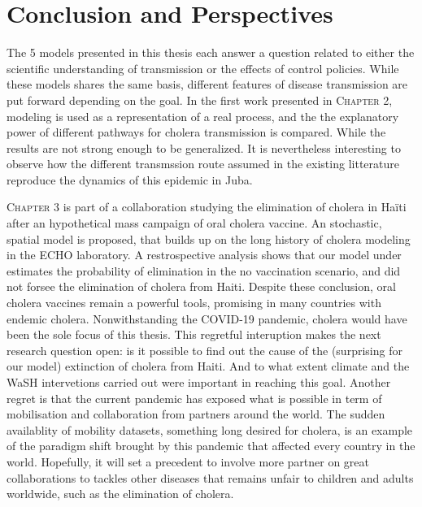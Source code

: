 \chapter*{Conclusion and Perspectives}
The 5 models presented in this thesis each answer a question related to either the scientific understanding of transmission or the effects of control policies. While these models shares the same basis, different features of disease transmission are put forward depending on the goal. 
In the first work presented in \textsc{Chapter 2}, modeling is used as a representation of a real process, and the the explanatory power of different pathways for cholera transmission is compared. While the results are not strong enough to be generalized. It is nevertheless interesting to observe how the different transmssion route assumed in the existing litterature reproduce the dynamics of this epidemic in Juba.

\textsc{Chapter 3} is part of a collaboration studying the elimination of cholera in Haïti after an hypothetical mass campaign of oral cholera vaccine. An stochastic, spatial model is proposed, that builds up on the long history of cholera modeling in the ECHO laboratory. A restrospective analysis shows that our model under estimates the probability of elimination in the no vaccination scenario, and did not forsee the elimination of cholera from Haiti. Despite these conclusion, oral cholera vaccines remain a powerful tools, promising in many countries with endemic cholera. 
Nonwithstanding the COVID-19 pandemic, cholera would have been the sole focus of this thesis. This regretful interuption makes the next research question open: is it possible to find out the cause of the (surprising for our model) extinction of cholera from Haiti. And to what extent climate and the WaSH intervetions carried out were important in reaching this goal. Another regret is that the current pandemic has exposed what is possible in term of mobilisation and collaboration from partners around the world. The sudden availablity of mobility datasets, something long desired for cholera, is an example of the paradigm shift brought by this pandemic that affected every country in the world. Hopefully, it will set a precedent to involve more partner on great collaborations to tackles other diseases that remains unfair to children and adults worldwide, such as the elimination of cholera.

